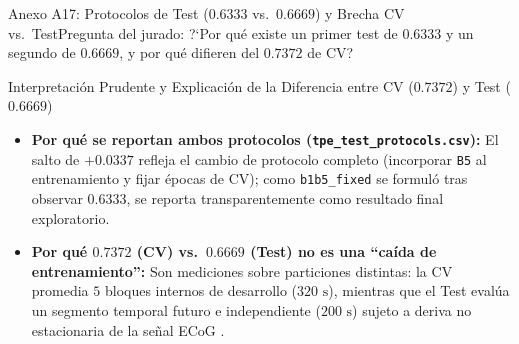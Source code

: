 \begin{frame}{Anexo A17: Protocolos de Test ($0.6333$ vs.\ $0.6669$) y Brecha CV vs.\ Test}{Pregunta del jurado: ?`Por qu\'e existe un primer test de $0.6333$ y un segundo de $0.6669$, y por qu\'e difieren del $0.7372$ de CV?}
  \label{anexo:protocolos_test_brecha}
  \centering

  \vspace{1.5mm}
  \begin{block}{Interpretaci\'on Prudente y Explicaci\'on de la Diferencia entre CV ($0.7372$) y Test ($0.6669$)}
    \scriptsize
    \begin{itemize}\setlength{\itemsep}{2.5pt}
      \item \textbf{Por qu\'e se reportan ambos protocolos (\texttt{tpe\_test\_protocols.csv}):} El salto de $+0.0337$ refleja el cambio de protocolo completo (incorporar \texttt{B5} al entrenamiento y fijar \'epocas de CV); como \texttt{b1b5\_fixed} se formul\'o tras observar $0.6333$, se reporta transparentemente como resultado final exploratorio.
      \item \textbf{Por qu\'e $0.7372$ (CV) vs.\ $0.6669$ (Test) no es una ``ca\'ida de entrenamiento'':} Son mediciones sobre particiones distintas: la CV promedia $5$ bloques internos de desarrollo ($320\text{ s}$), mientras que el Test eval\'ua un segmento temporal futuro e independiente ($200\text{ s}$) sujeto a deriva no estacionaria de la se\~nal ECoG \cite{rodas_valencia_tpe_ecog}. \hfill\hyperlink{anexo:indice_extra}{}
    \end{itemize}
  \end{block}
\end{frame}


